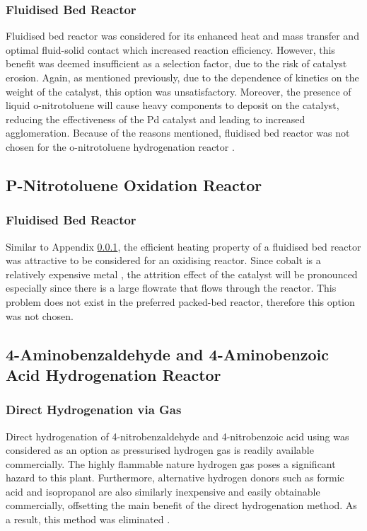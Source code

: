 \subsubsection{Fluidised Bed Reactor}
\label{fbr}
Fluidised bed reactor was considered for its enhanced heat and mass transfer and optimal fluid-solid contact which increased reaction efficiency. However, this benefit was deemed insufficient as a selection factor, due to the risk of catalyst erosion. Again, as mentioned previously, due to the dependence of kinetics on the weight of the catalyst, this option was unsatisfactory. Moreover, the presence of liquid o-nitrotoluene will cause heavy components to deposit on the catalyst, reducing the effectiveness of the Pd catalyst and leading to increased agglomeration. Because of the reasons mentioned, fluidised bed reactor was not chosen for the o-nitrotoluene hydrogenation reactor \cite{farrell_kinetics_1979}.

\subsection{P-Nitrotoluene Oxidation Reactor}
\subsubsection{Fluidised Bed Reactor}
Similar to Appendix \ref{fbr}, the efficient heating property of a fluidised bed reactor was attractive to be considered for an oxidising reactor. Since cobalt is a relatively expensive metal \cite{saib_fundamental_2014}, the attrition effect of the catalyst will be pronounced especially since there is a large flowrate that flows through the reactor. This problem does not exist in the preferred packed-bed reactor, therefore this option was not chosen.

\subsection{4-Aminobenzaldehyde and 4-Aminobenzoic Acid Hydrogenation Reactor}
\subsubsection{Direct Hydrogenation via  Gas}

Direct hydrogenation of 4-nitrobenzaldehyde and 4-nitrobenzoic acid using  was considered as an option as pressurised hydrogen gas is readily available commercially. The highly flammable nature hydrogen gas poses a significant hazard to this plant. Furthermore, alternative hydrogen donors such as formic acid and isopropanol are also similarly inexpensive and easily obtainable commercially, offsetting the main benefit of the direct hydrogenation method. As a result, this method was eliminated \cite{wang_golden_nodate}. 


